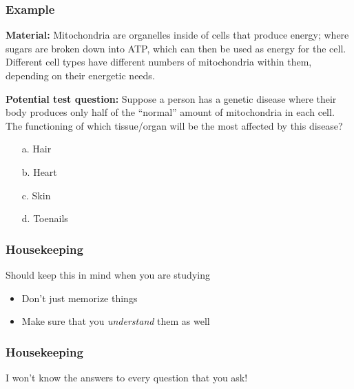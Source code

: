 \documentclass[10pt]{beamer}
\begin{document}
\begin{frame}[t]
\frametitle{Example}
\vspace{0.5cm}

	\textbf{Material:} Mitochondria are organelles inside of cells that produce energy; where sugars are broken down into ATP, which can then be used as energy for the cell. Different cell types have different numbers of mitochondria within them, depending on their energetic needs.
	
	\bigskip
	
	\textbf{Potential test question:}
	Suppose a person has a genetic disease where their body produces only half of the ``normal'' amount of mitochondria in each cell. The functioning of which tissue/organ will be the most affected by this disease? 
	
		\begin{enumerate}
			\item[a.] Hair
			\item[b.] Heart
			\item[c.] Skin
			\item[d.] Toenails 
		\end{enumerate}	
\end{frame}


\begin{frame}[t]
\frametitle{Housekeeping}
\vspace{0.5cm}

	Should keep this in mind when you are studying
	
		\begin{itemize}
			\medskip
			\item Don't just memorize things
			\bigskip
			\item Make sure that you \emph{understand} them as well
		\end{itemize}
\end{frame}


\begin{frame}[t]
\frametitle{Housekeeping}
\vspace{0.5cm}

	I won't know the answers to every question that you ask!

\end{frame}
\end{document}
